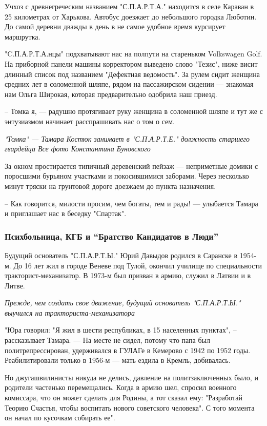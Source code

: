 \documentclass[a4paper,11pt]{extreport}
\begin{document}
Учхоз с древнегреческим названием "С.П.А.Р.Т.А." находится в селе Караван в 25
километрах от Харькова. Автобус доезжает до небольшого городка Люботин. До
самой деревни дважды в день в не самое удобное время курсирует маршрутка.

"C.П.А.Р.Т.А.нцы" подхватывают нас на полпути на стареньком Volkswagen Golf. На
приборной панели машины корректором выведено слово "Тезис", ниже висит длинный
список под названием "Дефектная ведомость". За рулем сидит женщина средних лет
в соломенной шляпе, рядом на пассажирском сидении --- знакомая нам Ольга Широкая,
которая предварительно одобрила наш приезд.

– Томка я, --- радушно протягивает руку женщина в соломенной шляпе и тут же с
энтузиазмом начинает расспрашивать нас о том о сем.
  
\emph{"Томка" --- Тамара Костюк занимает в "С.П.А.Р.Т.Е." должность старшего гвардейца
Все фото Константина Буновского}

За окном простирается типичный деревенский пейзаж --- неприметные домики с
поросшими бурьяном участками и покосившимися заборами. Через несколько минут
тряски на грунтовой дороге доезжаем до пункта назначения.

– Как говорится, милости просим, чем богаты, тем и рады! --- улыбается Тамара и
приглашает нас в беседку "Спартак".

\subsubsection{Психбольница, КГБ и ``Братство Кандидатов в Люди''}

Будущий основатель "С.П.А.Р.Т.Ы." Юрий Давыдов родился в Саранске в 1954-м. До
16 лет жил в городе Веневе под Тулой, окончил училище по специальности
тракторист-механизатор. В 1973-м был призван в армию, служил в Латвии и в
Литве.

{\em
Прежде, чем создать свое движение, будущий основатель "С.П.А.Р.Т.Ы." выучился на тракториста-механизатора
\/}

"Юра говорил: "Я жил в шести республиках, в 15 населенных пунктах", –
рассказывает Тамара. --- На месте не сидел, потому что папа был
политрепрессирован, удерживался в ГУЛАГе в Кемерово с 1942 по 1952 годы.
Реабилитировали только в 1956-м --- мать ездила в Кремль, добивалась. 

Но джугашвилинисты никуда не делись, давление на политзаключенных было, и
родители частенько перемещались. Когда в армию шел, спросил военного комиссара,
что он может сделать для Родины, а тот сказал ему: "Разработай Теорию Счастья,
чтобы воспитать нового советского человека". С того момента он начал по
кусочкам собирать ее".
\end{document}
